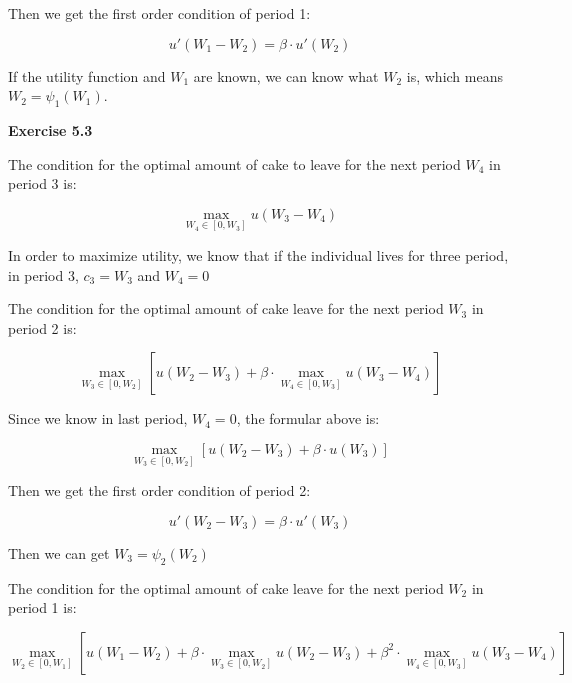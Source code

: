 \documentclass[letterpaper,12pt]{article}
\theoremstyle{definition}
\begin{document}
Then we get the first order condition of period 1:

\begin{equation*}
   u'\left ( W_{1}-W_{2} \right )=\beta\cdot  u'\left ( W_{2} \right )
\end{equation*}

If the utility function and $W_{1}$ are known, we can know what $W_{2}$ is, which means $W_{2} = \psi_1 (W_{1})$.

\noindent\textbf{Exercise 5.3}

The condition for the optimal amount of cake to leave for the next period $W_{4}$ in period 3 is:

\begin{equation*}
  \max_{W_{4}\in \left [ 0,W_{3} \right ]}u\left ( W_{3}-W_{4} \right )
\end{equation*}

In order to maximize utility, we know that if the individual lives for three period, in period 3, $c_{3} = W_{3}$ and $W_{4} = 0$

The condition for the optimal amount of cake leave for the next period $W_{3}$ in period 2 is:

\begin{equation*}
  \max_{W_{3}\in \left [ 0,W_{2} \right ]} \left [  u\left ( W_{2}-W_{3} \right )+\beta\cdot \max_{W_{4}\in \left [ 0,W_{3} \right ]} u\left ( W_{3}-W_{4} \right )\right ]
\end{equation*}

Since we know in last period, $W_{4} = 0$, the formular above is:

\begin{equation*}
  \max_{W_{3}\in \left [ 0,W_{2} \right ]} \left [  u\left ( W_{2}-W_{3} \right )+\beta\cdot  u\left ( W_{3} \right )\right ]
\end{equation*}

Then we get the first order condition of period 2:

\begin{equation*}
   u'\left ( W_{2}-W_{3} \right )=\beta\cdot  u'\left ( W_{3} \right )
\end{equation*}

Then we can get $W_{3} = \psi_2 (W_{2})$

The condition for the optimal amount of cake leave for the next period $W_{2}$ in period 1 is:

\begin{equation*}
  \max_{W_{2}\in \left [ 0,W_{1} \right ]} \left [  u\left ( W_{1}-W_{2} \right )+\beta\cdot\max_{W_{3}\in \left [ 0,W_{2} \right ]} u\left ( W_{2}-W_{3} \right )+\beta ^{2}\cdot \max_{W_{4}\in \left [ 0,W_{3} \right ]}u\left ( W_{3}-W_{4} \right )\right ]
\end{equation*}
\end{document}
